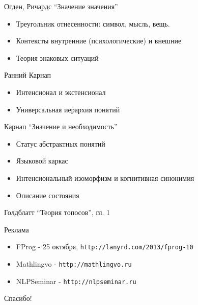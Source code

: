 \documentclass{beamer}
\begin{document}
\begin{frame}{Огден, Ричардс ``Значение значения''}
  \begin{itemize}
    \item Треугольник отнесенности: символ, мысль, вещь.
    \item Контексты внутренние (психологические) и внешние
    \item Теория знаковых ситуаций
  \end{itemize}
\end{frame}

\begin{frame}{Ранний Карнап}
  \begin{itemize}
    \item Интенсионал и экстенсионал
    \item Универсальная иерархия понятий
  \end{itemize}
\end{frame}

\begin{frame}{Карнап ``Значение и необходимость''}
  \begin{itemize}
    \item Статус абстрактных понятий
    \item Языковой каркас
    \item Интенсиональный изоморфизм и когнитивная синонимия
    \item Описание состояния
  \end{itemize}
\end{frame}

\begin{frame}{Голдблатт ``Теория топосов'', гл. 1}
\end{frame}

\begin{frame}{Реклама}
  \begin{itemize}
    \item FProg - 25 октября, \texttt{http://lanyrd.com/2013/fprog-10}
    \item Mathlingvo - \texttt{http://mathlingvo.ru}
    \item NLPSeminar - \texttt{http://nlpseminar.ru}
  \end{itemize}
\end{frame}


\begin{frame}{}
    \thispagestyle{empty}
    \begin{center}
        {\large Спасибо!}
    \end{center}
\end{frame}


\end{document}
